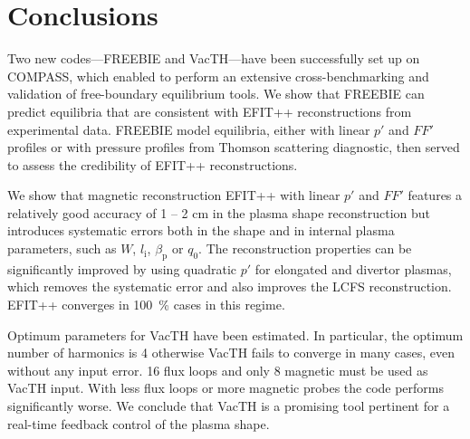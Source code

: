 
\section{Conclusions} %
\label{sec:conclusions}

Two new codes---FREEBIE and VacTH---have been successfully set up on COMPASS, which enabled to perform an extensive cross-benchmarking and validation of free-boundary equilibrium tools. We show that FREEBIE can predict equilibria that are consistent with EFIT++ reconstructions from experimental data. FREEBIE model equilibria, either with linear $p'$ and $FF'$ profiles or with pressure profiles from Thomson scattering diagnostic, then served to assess the credibility of EFIT++ reconstructions. 

We show that magnetic reconstruction EFIT++ with linear $p'$ and $FF'$ features a relatively good accuracy of 1 -- 2 cm in the plasma shape reconstruction but introduces systematic errors both in the shape and in internal plasma parameters, such as $W$, $l_{\mathrm i}$, $\beta_{\mathrm p}$ or $q_0$. The reconstruction properties can be significantly improved by using quadratic $p'$ for elongated and divertor plasmas, which removes the systematic error and also improves the LCFS reconstruction. EFIT++ converges in 100~\% cases in this regime.

Optimum parameters for VacTH have been estimated. In particular, the optimum number of harmonics is 4 otherwise VacTH fails to converge in many cases, even without any input error. 16 flux loops and only 8 magnetic must be used as VacTH input. With less flux loops or more magnetic probes the code performs significantly worse. We conclude that VacTH is a promising tool pertinent for a real-time feedback control of the plasma shape.

